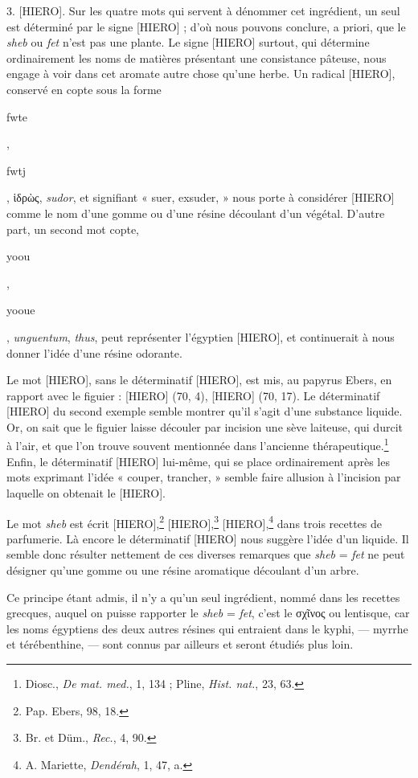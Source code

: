 \documentclass[a4paper, 11pt, oneside]{article}
\begin{document}
3. [HIERO]. Sur les quatre mots qui servent à dénommer cet ingrédient, un seul est déterminé par le signe [HIERO] ; d'où nous pouvons conclure, a priori, que le \emph{sheb} ou \emph{fet} n'est pas une plante. Le signe [HIERO] surtout, qui détermine ordinairement les noms de matières présentant une consistance pâteuse, nous engage à voir dans cet aromate autre chose qu'une herbe. Un radical [HIERO], conservé en copte sous la forme \begin{coptic}fwte\end{coptic}, \begin{coptic}fwtj\end{coptic}, ἱδρὼς, \emph{sudor}, et signifiant « suer, exsuder, » nous porte à considérer [HIERO] comme le nom d'une gomme ou d'une résine découlant d'un végétal. D'autre part, un second mot copte, \begin{coptic}yoou\end{coptic}, \begin{coptic}yooue\end{coptic}, \emph{unguentum}, \emph{thus}, peut représenter l'égyptien [HIERO], et continuerait à nous donner l'idée d'une résine odorante.

Le mot [HIERO], sans le déterminatif [HIERO], est mis, au papyrus Ebers, en rapport avec le figuier : [HIERO] (70, 4), [HIERO] (70, 17). Le déterminatif [HIERO] du second exemple semble montrer qu'il s'agit d'une substance liquide. Or, on sait que le figuier laisse découler par incision une sève laiteuse, qui durcit à l'air, et que l'on trouve souvent mentionnée dans l'ancienne thérapeutique.\footnote{Diosc., \emph{De mat. med.}, 1, 134 ; Pline, \emph{Hist. nat.}, 23, 63.} Enfin, le déterminatif [HIERO] lui-même, qui se place ordinairement après les mots exprimant l'idée « couper, trancher, » semble faire allusion à l'incision par laquelle on obtenait le [HIERO].

Le mot \emph{sheb} est écrit [HIERO],\footnote{Pap. Ebers, 98, 18.} [HIERO],\footnote{Br. et Düm., \emph{Rec.}, 4, 90.} [HIERO],\footnote{A. Mariette, \emph{Dendérah}, 1, 47, a.} dans trois recettes de parfumerie. Là encore le déterminatif [HIERO] nous suggère l'idée d'un liquide. Il semble donc résulter nettement de ces diverses remarques que \emph{sheb} = \emph{fet} ne peut désigner qu'une gomme ou une résine aromatique découlant d'un arbre.

Ce principe étant admis, il n'y a qu'un seul ingrédient, nommé dans les recettes grecques, auquel on puisse rapporter le \emph{sheb} = \emph{fet}, c'est le σχῖνος ou lentisque, car les noms égyptiens des deux autres résines qui entraient dans le kyphi, --- myrrhe et térébenthine, --- sont connus par ailleurs et seront étudiés plus loin.
\end{document}

